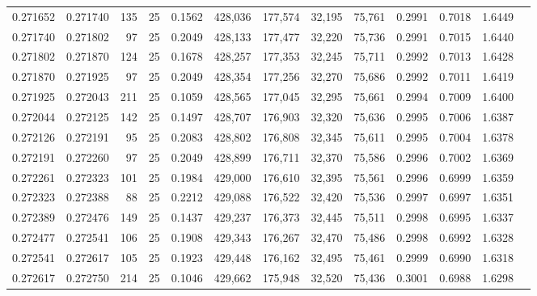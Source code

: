 \begin{tabular}{rrrrrrrrrrrrr}
0.271652 & 0.271740 &   135 &  25 &                                     0.1562 & 428,036 & 177,574 &  32,195 &  75,761 & 0.2991 & 0.7018 & 1.6449 \\
0.271740 & 0.271802 &    97 &  25 &                                     0.2049 & 428,133 & 177,477 &  32,220 &  75,736 & 0.2991 & 0.7015 & 1.6440 \\
0.271802 & 0.271870 &   124 &  25 &                                     0.1678 & 428,257 & 177,353 &  32,245 &  75,711 & 0.2992 & 0.7013 & 1.6428 \\
0.271870 & 0.271925 &    97 &  25 &                                     0.2049 & 428,354 & 177,256 &  32,270 &  75,686 & 0.2992 & 0.7011 & 1.6419 \\
0.271925 & 0.272043 &   211 &  25 &                                     0.1059 & 428,565 & 177,045 &  32,295 &  75,661 & 0.2994 & 0.7009 & 1.6400 \\
0.272044 & 0.272125 &   142 &  25 &                                     0.1497 & 428,707 & 176,903 &  32,320 &  75,636 & 0.2995 & 0.7006 & 1.6387 \\
0.272126 & 0.272191 &    95 &  25 &                                     0.2083 & 428,802 & 176,808 &  32,345 &  75,611 & 0.2995 & 0.7004 & 1.6378 \\
0.272191 & 0.272260 &    97 &  25 &                                     0.2049 & 428,899 & 176,711 &  32,370 &  75,586 & 0.2996 & 0.7002 & 1.6369 \\
0.272261 & 0.272323 &   101 &  25 &                                     0.1984 & 429,000 & 176,610 &  32,395 &  75,561 & 0.2996 & 0.6999 & 1.6359 \\
0.272323 & 0.272388 &    88 &  25 &                                     0.2212 & 429,088 & 176,522 &  32,420 &  75,536 & 0.2997 & 0.6997 & 1.6351 \\
0.272389 & 0.272476 &   149 &  25 &                                     0.1437 & 429,237 & 176,373 &  32,445 &  75,511 & 0.2998 & 0.6995 & 1.6337 \\
0.272477 & 0.272541 &   106 &  25 &                                     0.1908 & 429,343 & 176,267 &  32,470 &  75,486 & 0.2998 & 0.6992 & 1.6328 \\
0.272541 & 0.272617 &   105 &  25 &                                     0.1923 & 429,448 & 176,162 &  32,495 &  75,461 & 0.2999 & 0.6990 & 1.6318 \\
0.272617 & 0.272750 &   214 &  25 &                                     0.1046 & 429,662 & 175,948 &  32,520 &  75,436 & 0.3001 & 0.6988 & 1.6298 \\

\end{tabular}
